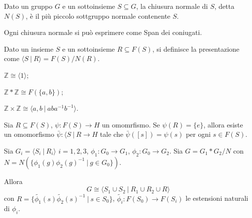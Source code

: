 \begin{defn}
    Dato un gruppo $G$ e un sottoinsieme $S\subseteq G$, la chiusura normale di $S$, detta $N(S)$, \`e il pi\`u piccolo sottgruppo normale contenente $S$.
\end{defn}

\begin{oss}
    Ogni chiusura normale si pu\`o esprimere come Span dei coniugati.
\end{oss}

\begin{defn}
    Dato un insieme $S$ e un sottoinsieme $R\subseteq F(S)$, si definisce la presentazione come $\langle S \ |\ R\rangle = F(S)/N(R)$.
\end{defn}

\begin{ex}
    \begin{nlist}
        \item $\mathbb{Z} \cong \langle 1 \rangle$;
        \item $\mathbb{Z}*\mathbb{Z}\cong F(\{a,b\})$;
        \item $\mathbb{Z}\times\mathbb{Z}\cong\langle a,b\ |\ aba^{-1}b^{-1}\rangle$.
    \end{nlist}
\end{ex}

\begin{prop}
    Sia $R\subseteq F(S)$, $\psi\colon F(S)\rightarrow H$ un omomrfismo. Se $\psi(R)=\{e\}$, allora esiste un omomorfismo $\bar{\psi}\colon \langle S\ |\ R \rightarrow H$ tale che $\bar{\psi}([s])=\psi(s)$ per ogni $s\in F(S)$.
\end{prop}

\begin{prop}
    Sia $G_i = \langle S_i\ |\ R_i\rangle$ $i=1,2,3$, $\phi_1\colon G_0 \rightarrow G_1$, $\phi_2\colon G_0\rightarrow G_2$. Sia $G = G_1 * G_2 /N$ con $N = N(\{\phi_1(g)\phi_2(g)^{-1}\ |\ g\in G_0\})$.

    Allora $$G\cong \langle S_1 \cup S_2\ |\ R_1\cup R_2\cup R\rangle$$ con $R =\{\tilde{\phi_1}(s)\tilde{\phi_2}(s)^{-1}\ |\ s\in S_0\}$, $\tilde{\phi_i}\colon F(S_0)\rightarrow F(S_i)$ le estensioni naturali di $\phi_i$.
\end{prop}
